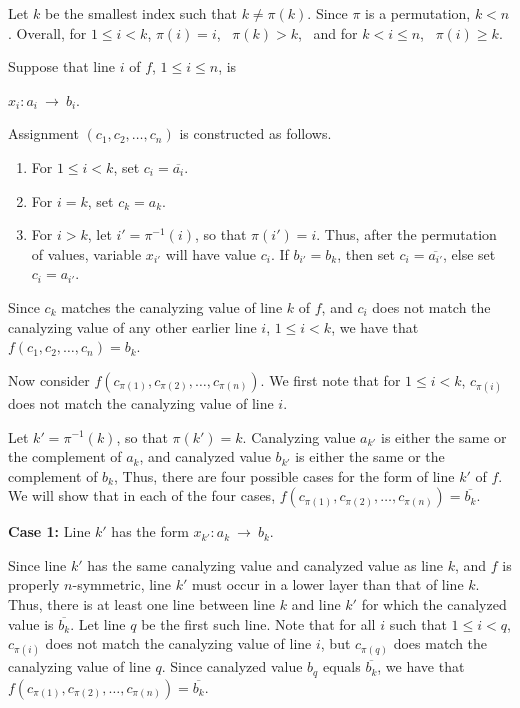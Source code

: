 Let $k$ be the smallest index such that $k \neq \pi(k)$.  Since
$\pi$ is a permutation, $k < n$.  Overall, for $1 \leq i < k$,
$\pi(i) = i$,~ $\pi(k) > k$,~ and for $k < i \leq n$,~ $\pi(i) \geq k$.

\smallskip

Suppose that line $i$ of $f$, $1 \leq i \leq n$, is 

\smallskip

\hspace*{0.25in} $x_i : a_i ~\longrightarrow~ b_i$. 

\smallskip

\noindent
Assignment $(c_1, c_2, \ldots,  c_n)$ is constructed as follows.
\begin{enumerate}
\item For $1 \leq i < k$, set $c_i = \overline{a_i}$.  
\item For $i = k$, set $c_k =a_k$. 
\item For $i > k$, let $i' = \pi^{-1}(i)$, so that $\pi(i')
= i$.  Thus, after the permutation of values, variable $x_{i'}$
will have value $c_i$.  If $b_{i'} = b_k$, then set $c_i =
\overline{a_{i'}}$, else set $c_i =  a_{i'}$.
\end{enumerate}
Since $c_k$ matches the canalyzing value of line $k$ of $f$, and
$c_i$ does not match the canalyzing value of any other earlier line
$i$, $1 \leq i < k$, we have that $f(c_1, c_2, \ldots,  c_n) = b_k$.

Now consider $f(c_{\pi(1)}, c_{\pi(2)}, \ldots, c_{\pi(n)})$.  We
first note that for $1 \leq i < k$, $c_{\pi(i)}$ does not match the
canalyzing value of line $i$.

Let $k' = \pi^{-1}(k)$, so that $\pi(k') = k$.  Canalyzing value
$a_{k'}$ is either the same or the complement of $a_k$, and canalyzed
value $b_{k'}$ is either the same or the complement of $b_k$, Thus,
there are four possible cases for the form of line $k'$ of $f$.  We
will show that in each of the four cases, $f(c_{\pi(1)}, c_{\pi(2)},
\ldots, c_{\pi(n)}) = \overline{b_k}$.

\medskip

\noindent
{\bf Case 1:} Line $k'$ has the form  $x_{k'} : a_k ~\longrightarrow~ b_k$.  

\smallskip

Since line $k'$
has the same canalyzing value and canalyzed value as line $k$, and
$f$ is properly $n$-symmetric, line $k'$ must occur in a lower layer
than that of line $k$.  Thus, there is at least one line between
line $k$ and line $k'$ for which the canalyzed value is $\overline{b_k}$.
Let line $q$ be the first such line.  Note that for all $i$ such
that $1 \leq i < q$, $c_{\pi(i)}$ does not match the canalyzing
value of line $i$, but $c_{\pi(q)}$ does match the canalyzing value
of line $q$.  Since canalyzed value $b_q$ equals $\overline{b_k}$,
we have that $f(c_{\pi(1)}, c_{\pi(2)}, \ldots, c_{\pi(n)}) =
\overline{b_k}$.

